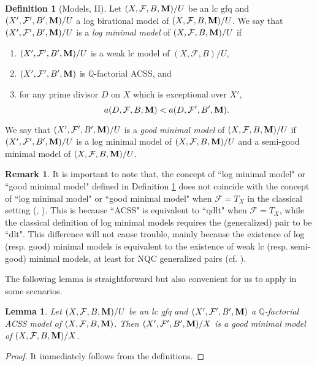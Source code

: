 \documentclass[11pt]{amsart}
\numberwithin{equation}{section}
\newcommand{\Mm}{{\bf{M}}}
\newcommand{\Qq}{\mathbb{Q}}
\newcommand{\Ff}{\mathcal{F}}
\newtheorem{lem}[thm]{Lemma}
\theoremstyle{definition}
\newtheorem{defn}[thm]{Definition}
\theoremstyle{definition}
\newtheorem{rem}[thm]{Remark}
\theoremstyle{definition}
\begin{document}
\begin{defn}[Models, II]\label{defn: models ii}
Let $(X,\Ff,B,\Mm)/U$ be an lc gfq and $(X',\Ff',B',\Mm)/U$ a log birational model of $(X,\Ff,B,\Mm)/U$. We say that $(X',\Ff',B',\Mm)/U$ is a \emph{log minimal model} of $(X,\Ff,B,\Mm)/U$ if 
\begin{enumerate}
    \item $(X',\Ff',B',\Mm)/U$ is a weak lc model of $(X,\Ff,B)/U$,
    \item $(X',\Ff',B',\Mm)$ is $\Qq$-factorial ACSS, and
    \item for any prime divisor $D$ on $X$ which is exceptional over $X'$, 
    $$a(D,\Ff,B,\Mm)<a(D,\Ff',B',\Mm).$$
\end{enumerate}
We say that $(X',\Ff',B',\Mm)/U$ is a \emph{good minimal model} of $(X,\Ff,B,\Mm)/U$ if $(X',\Ff',B',\Mm)/U$ is a log minimal model of $(X,\Ff,B,\Mm)/U$ and a semi-good minimal model of $(X,\Ff,B,\Mm)/U$.
\end{defn}

\begin{rem}
    It is important to note that, the concept of ``log minimal model" or ``good minimal model" defined in Definition \ref{defn: models ii} does not coincide with the concept of  ``log minimal model" or ``good minimal model" when $\Ff=T_X$ in the classical setting (\cite[Definition 2.1]{Bir12}, \cite[Definition 3.2]{HL21a}). This is because ``ACSS" is equivalent to ``qdlt" when $\Ff=T_X$, while the classical definition of log minimal models requires the (generalized) pair to be ``dlt". This difference will not cause trouble, mainly because the existence of log (resp. good) minimal models is equivalent to the existence of weak lc (resp. semi-good) minimal models, at least for NQC generalized pairs (cf. \cite[Theorem 2.7]{TX23}).
\end{rem}

The following lemma is straightforward but also convenient for us to apply in some scenarios.
\begin{lem}\label{lem: acss model is gmm}
Let $(X,\Ff,B,\Mm)/U$ be an lc gfq and $(X',\Ff',B',\Mm)$ a $\Qq$-factorial ACSS model of $(X,\Ff,B,\Mm)$. Then $(X',\Ff',B',\Mm)/X$ is a good minimal model of $(X,\Ff,B,\Mm)/X$.
\end{lem}
\begin{proof}
    It immediately follows from the definitions.
\end{proof}
\end{document}
